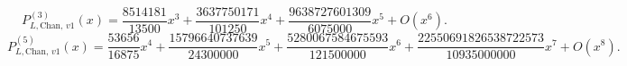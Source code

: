 \begin{equation}
P_{L,\mathrm{Chan},\,v1}^{(3)}(x)=\frac{8514181}{13500}x^{3}+\frac{3637750171}{101250}x^{4}+\frac{9638727601309}{6075000}x^{5}+O(x^{6}).
\end{equation}
\begin{equation}
P_{L,\mathrm{Chan},\,v1}^{(5)}(x)=\frac{53656}{16875}x^{4}+\frac{15796640737639}{24300000}x^{5}+\frac{5280067584675593}{121500000}x^{6}+\frac{22550691826538722573}{10935000000}x^{7}+O(x^{8}).
\end{equation}
